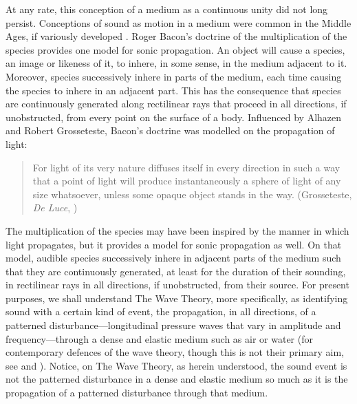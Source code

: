 At any rate, this conception of a medium as a continuous unity did not long persist. Conceptions of sound as motion in a medium were common in the Middle Ages, if variously developed \citep{Pasnau:2000aa}. Roger Bacon's doctrine of the multiplication of the species provides one model for sonic propagation. An object will cause a species, an image or likeness of it, to inhere, in some sense, in the medium adjacent to it. Moreover, species successively inhere in parts of the medium, each time causing the species to inhere in an adjacent part. This has the consequence that species are continuously generated along rectilinear rays that proceed in all directions, if unobstructed, from every point on the surface of a body. Influenced by Alhazen and Robert Grosseteste, Bacon's doctrine was modelled on the propagation of light: 
\begin{quote}
	For light of its very nature diffuses itself in every direction in such a way that a point of light will produce instantaneously a sphere of light of any size whatsoever, unless some opaque object stands in the way. (Grosseteste, \emph{De Luce}, \citealt[10]{Riedl:1942it})
\end{quote}
The multiplication of the species may have been inspired by the manner in which light propagates, but it provides a model for sonic propagation as well. On that model, audible species successively inhere in adjacent parts of the medium such that they are continuously generated, at least for the duration of their sounding, in rectilinear rays in all directions, if unobstructed, from their source. For present purposes, we shall understand The Wave Theory, more specifically, as identifying sound with a certain kind of event, the propagation, in all directions, of a patterned disturbance---longitudinal pressure waves that vary in amplitude and frequency---through a dense and elastic medium such as air or water (for contemporary defences of the wave theory, though this is not their primary aim, see \citealt{OShaughnessy:2009aa} and \citealt{Sorensen:2009aa}). Notice, on The Wave Theory, as herein understood, the sound event is not the patterned disturbance in a dense and elastic medium so much as it is the propagation of a patterned disturbance through that medium. 

